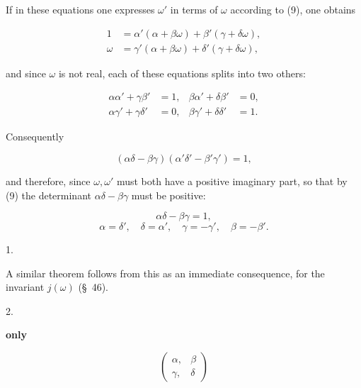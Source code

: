 If in these equations one expresses $\omega'$ in terms of $\omega$ according to (9), one obtains

\[
\begin{aligned}
1 &= \alpha'(\alpha+\beta\omega) + \beta'(\gamma+\delta\omega),\\
\omega &= \gamma'(\alpha+\beta\omega) + \delta'(\gamma+\delta\omega),
\end{aligned}
\]

and since $\omega$ is not real, each of these equations splits into two others:

\[
\begin{aligned}
\alpha\alpha' + \gamma\beta' &= 1, & \beta\alpha' + \delta\beta' &= 0,\\
\alpha\gamma' + \gamma\delta' &= 0, & \beta\gamma' + \delta\delta' &= 1.
\end{aligned}
\]

Consequently

\[
(\alpha\delta - \beta\gamma)(\alpha'\delta' - \beta'\gamma') = 1,
\]

and therefore, since $\omega,\omega'$ must both have a positive imaginary part, so that by (9) the determinant $\alpha\delta-\beta\gamma$ must be positive:

\[
\alpha\delta - \beta\gamma = 1,
\]
\[
\alpha = \delta', \quad \delta = \alpha', \quad \gamma = -\gamma', \quad \beta = -\beta'.
\]

1. 

A similar theorem follows from this as an immediate consequence, for the invariant $j(\omega)$ (\S\ 46).

2. 


 \textbf{only} 

\[
\begin{pmatrix} \alpha, & \beta \\ \gamma, & \delta \end{pmatrix}
\]



